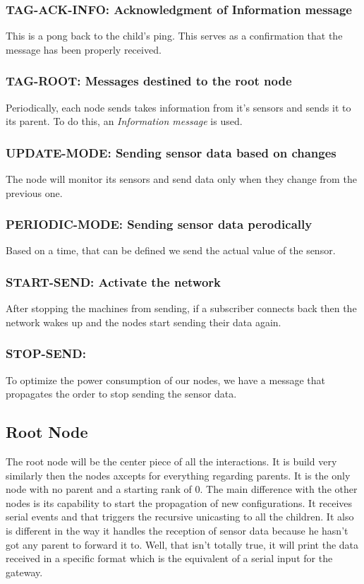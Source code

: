 \documentclass[a4paper,11pt]{article}
\begin{document}
\subsubsection{TAG-ACK-INFO: Acknowledgment of Information message}
This is a pong back to the child's ping. This serves as a confirmation that the message has been properly received.


\subsubsection{TAG-ROOT: Messages destined to the root node}
Periodically, each node sends takes information from it's sensors and sends it to its parent. To do this, an \textit{Information message} is used.


\subsubsection{UPDATE-MODE: Sending sensor data based on changes}
The node will monitor its sensors and send data only when they change from the previous one.

\subsubsection{PERIODIC-MODE: Sending sensor data perodically}
Based on a time, that can be defined we send the actual value of the sensor.

\subsubsection{START-SEND: Activate the network}
After stopping the machines from sending, if a subscriber connects back then the network wakes up and the nodes start sending their data again.

\subsubsection{STOP-SEND:}
To optimize the power consumption of our nodes, we have a message that propagates the order to stop sending the sensor data.


\subsection{Root Node}
The root node will be the center piece of all the interactions.  It is build very similarly then the nodes axcepts for everything regarding parents.
It is the only node with no parent and a starting rank of 0. The main difference with the other nodes is its capability to start the propagation of new configurations.
It receives serial events and that triggers the recursive unicasting to all the children. It also is different in the way it handles the reception of sensor data because he hasn't got any parent to forward it to. Well, that isn't totally true, it will print the data received in a specific format which is the equivalent of a serial input for the gateway.
\end{document}

